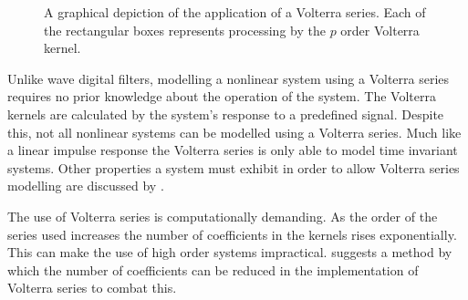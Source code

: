 			\begin{figure}[h!]
				\centering
				\caption{A graphical depiction of the application of a Volterra series. Each of the
					rectangular boxes represents processing by the $p$ order Volterra
					kernel.}
				\label{fig:VolterraModel}
			\end{figure}

			Unlike wave digital filters, modelling a nonlinear system using a Volterra series requires no prior
			knowledge about the operation of the system. The Volterra kernels are calculated by the system's
			response to a predefined signal. Despite this, not all nonlinear systems can be modelled using a
			Volterra series. Much like a linear impulse response the Volterra series is only able to model time
			invariant systems. Other properties a system must exhibit in order to allow Volterra series
			modelling are discussed by \citet{billings2013nonlinear}.

			The use of Volterra series is computationally demanding. As the order of the series used increases
			the number of coefficients in the kernels rises exponentially. This can make the use of high order
			systems impractical. \citet{reed1996practical} suggests a method by which the number of
			coefficients can be reduced in the implementation of Volterra series to combat this.

